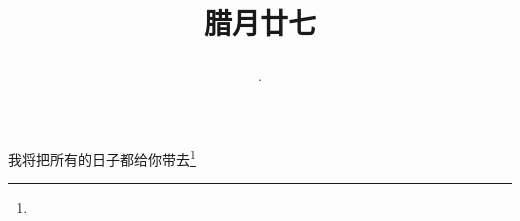 \title{\date[d=6,m=2,y=2024][year:cn-y,年,month:cn,day:cn,日,·,weekday]·腊月廿七 }
我将把所有的日子都给你带去\footnote{ }

